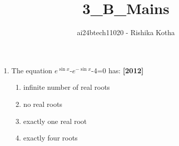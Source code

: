 \documentclass[journal,12pt,twocolumn]{IEEEtran}
\theoremstyle{remark}
\begin{document}

\vspace{3cm}

\title{3\_B\_Mains}
\author{ai24btech11020 - Rishika Kotha}

\maketitle
\bigskip                                                                                          \renewcommand{\thefigure}{\theenumi}             \renewcommand{\thetable}{\theenumi}

\begin{enumerate}[start=24]
\item The equation $e^{\sin x}$-$e^{-\sin x}$-4=0 has:
	\hfill\textbf{[2012]}\\
	\begin{enumerate}[label=\alph*.]
	\item  infinite number of real roots
	\item  no real roots
	\item exactly one real root
	\item exactly four roots
	\end{enumerate}


\end{enumerate}
\end{document}
